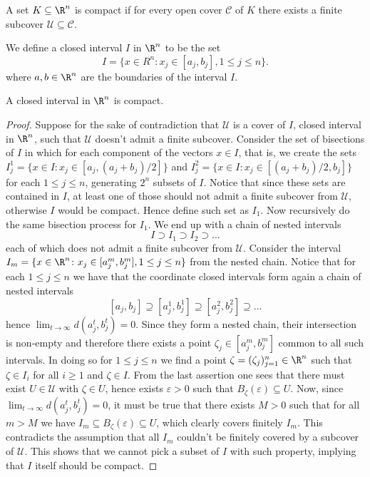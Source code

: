 \begin{definition}
A set \(K \subseteq \R^n\) is compact if for every open cover \(\mathcal C\)
of \(K\) there exists a finite subcover \(\mathcal U \subseteq \mathcal C\).
\end{definition}

\begin{definition}
We define a closed interval \(I\) in \(\R^n\) to be the set
\[
I = \{x \in R^n \colon x_j \in [a_j, b_j], 1 \leq j \leq n\}.
\]
where \(a, b \in \R^n\) are the boundaries of the interval \(I\).
\end{definition}

\begin{proposition}\label{prop: closed-interval compact}
A closed interval in \(\R^n\) is compact.
\end{proposition}

\begin{proof}
Suppose for the sake of contradiction that \(\mathcal U\) is a cover of \(I\),
closed interval in \(\R^n\), such that \(\mathcal U\) doesn't admit a finite
subcover. Consider the set of bisections of \(I\) in which for each component
of the vectors \(x \in I\), that is, we create the sets \(I_j^1 = \{x \in I \colon
x_j \in [a_j, (a_j + b_j)/2]\}\) and \(I_j^2 = \{x \in I \colon x_j \in [(a_j +
b_j)/2, b_j]\}\) for each \(1 \leq j \leq n\), generating \(2^n\) subsets of
\(I\). Notice that since these sets are contained in \(I\), at least one of
those should not admit a finite subcover from \(\mathcal U\), otherwise \(I\)
would be compact. Hence define such set as \(I_1\). Now recursively do the
same bisection process for \(I_1\). We end up with a chain of nested intervals
\[
I \supset I_1 \supset I_2 \supset \dots
\]
each of which does not admit a finite subcover from \(\mathcal U\). Consider
the interval \(I_m = \{x \in \R^n \colon x_j \in [a^m_j, b_j^m], 1 \leq j \leq n\}\)
from the nested chain. Notice that for each \(1 \leq j \leq n\) we have that
the coordinate closed intervals form again a chain of nested intervals
\[
[a_j, b_j] \supseteq [a_j^1, b_j^1] \supseteq [a_j^2, b_j^2] \supseteq \dots
\]
hence \(\lim_{t \to \infty} d(a_j^t, b_j^t) = 0\). Since they form a nested
chain, their intersection is non-empty and therefore there exists a point
\(\zeta_j \in  [a_j^m, b_j^m]\) common to all such intervals. In doing so for
\(1 \leq j \leq n\) we find a point \(\zeta = (\zeta_j)_{j=1}^n \in \R^n\)
such that \(\zeta \in I_i\) for all \(i \geq 1\) and \(\zeta \in I\). From the
last assertion one sees that there must exist \(U \in \mathcal U\) with
\(\zeta \in U\), hence exists \(\varepsilon > 0\) such that
\(B_\zeta(\varepsilon) \subseteq U\). Now, since \(\lim_{t \to \infty}
d(a_j^t, b_j^t) = 0\), it must be true that there exists \(M > 0\) such that
for all \(m > M\) we have \(I_m \subseteq B_\zeta(\varepsilon) \subseteq U\),
which clearly covers finitely \(I_m\). This contradicts the assumption that
all \(I_m\) couldn't be finitely covered by a subcover of \(\mathcal U\). This
shows that we cannot pick a subset of \(I\) with such property, implying that
\(I\) itself should be compact.
\end{proof}

